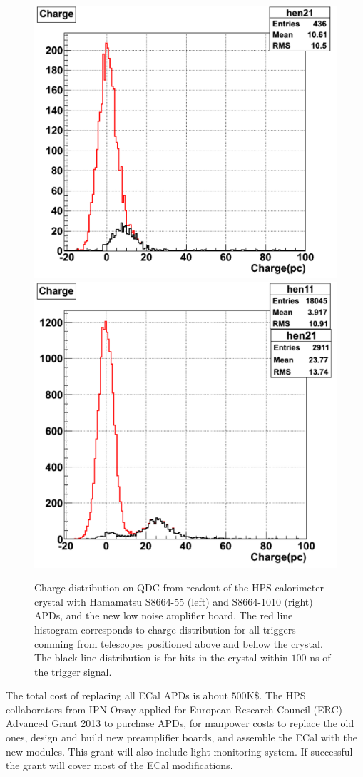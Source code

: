 \begin{figure}[t]
\includegraphics[scale=0.37]{ecal/MIP_5x5_APD.png}
\includegraphics[scale=0.37]{ecal/MIP_10x10_APD.png}
\caption{\small{Charge distribution on QDC from readout of the HPS calorimeter crystal with Hamamatsu S8664-55 (left) and S8664-1010 (right) APDs, and the new low noise amplifier board. The red line histogram corresponds to charge distribution for all triggers comming from telescopes positioned above and bellow the crystal. The black line distribution is for hits in the crystal within $100$ ns of the trigger signal. }}\label{fig:mip10x10}
\end{figure}

The total cost of replacing all ECal APDs is about $500$K\$. The HPS collaborators from IPN Orsay applied for  European Research Council (ERC) Advanced Grant 2013 to purchase APDs, for manpower costs to replace the old ones, design and build new preamplifier boards, and assemble the ECal with the new modules. This grant will also include light monitoring system. If successful the grant will cover most of the ECal modifications. 
